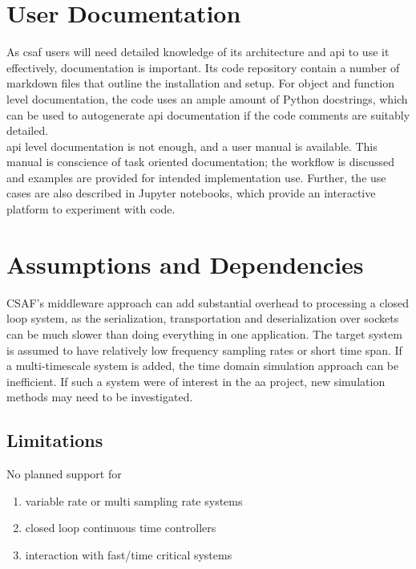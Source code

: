 \section{User Documentation}

As \acrshort{csaf} users will need detailed knowledge of its architecture and \acrshort{api} to use it 
effectively, documentation is important. Its code repository contain a number of markdown files that outline 
the installation and setup. For object and function level documentation, the code uses an ample amount of 
Python docstrings, which can be used to autogenerate \acrshort{api} documentation if the code comments 
are suitably detailed. \\

\acrshort{api} level documentation is not enough, and  a user manual is available. This manual is conscience 
of task oriented documentation; the workflow is discussed and examples are provided for intended 
implementation use. Further, the use cases are also described in Jupyter notebooks, which provide an 
interactive platform to experiment with code.

\section{Assumptions and Dependencies}

CSAF's middleware approach can add substantial overhead to processing a closed loop system, as the 
serialization, transportation and deserialization over sockets can be much slower than doing everything in one 
application. The target system is assumed to have relatively low frequency sampling rates or short time span. 
If a multi-timescale system is added, the time domain simulation approach can be inefficient. If such a system 
were of interest in the \acrshort{aa} project, new simulation methods may need to be investigated.\\

\subsection{Limitations}

No planned support for
\begin{enumerate}
\item   variable rate or multi sampling rate systems
\item  closed loop continuous time controllers
\item interaction with fast/time critical systems
\end{enumerate}

